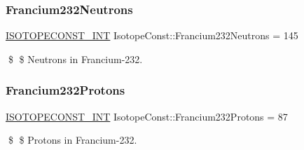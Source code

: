 \subsubsection{\texorpdfstring{Francium232\+Neutrons}{Francium232Neutrons}}
{\footnotesize\ttfamily \mbox{\hyperlink{group___isotope_const-_macros_ga5f18360b3e99483a35c32d789e62621c}{I\+S\+O\+T\+O\+P\+E\+C\+O\+N\+S\+T\+\_\+\+I\+NT}} Isotope\+Const\+::\+Francium232\+Neutrons = 145}

\$ \$ Neutrons in Francium-\/232. \mbox{\label{group___isotope_const-_francium-_fr232_ga80684012e86db61daff6a030ef3f2ecd}} 
\subsubsection{\texorpdfstring{Francium232\+Protons}{Francium232Protons}}
{\footnotesize\ttfamily \mbox{\hyperlink{group___isotope_const-_macros_ga5f18360b3e99483a35c32d789e62621c}{I\+S\+O\+T\+O\+P\+E\+C\+O\+N\+S\+T\+\_\+\+I\+NT}} Isotope\+Const\+::\+Francium232\+Protons = 87}

\$ \$ Protons in Francium-\/232. 